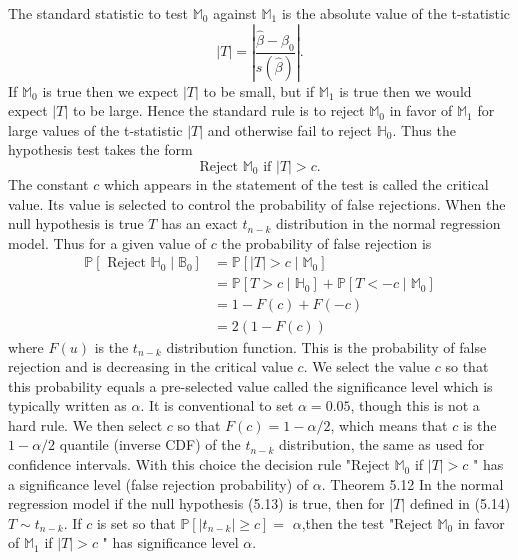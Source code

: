 \documentclass[10pt]{article}
\begin{document}
The standard statistic to test $\mathbb{M}_{0}$ against $\mathbb{M}_{1}$ is the absolute value of the t-statistic
$$
|T|=\left|\frac{\widehat{\beta}-\beta_{0}}{s(\widehat{\beta})}\right| .
$$
If $\mathbb{M}_{0}$ is true then we expect $|T|$ to be small, but if $\mathbb{M}_{1}$ is true then we would expect $|T|$ to be large. Hence the standard rule is to reject $\mathbb{M}_{0}$ in favor of $\mathbb{M}_{1}$ for large values of the t-statistic $|T|$ and otherwise fail to reject $\mathbb{H}_{0}$. Thus the hypothesis test takes the form
$$
\text { Reject } \mathbb{M}_{0} \text { if }|T|>c \text {. }
$$
The constant $c$ which appears in the statement of the test is called the critical value. Its value is selected to control the probability of false rejections. When the null hypothesis is true $T$ has an exact $t_{n-k}$ distribution in the normal regression model. Thus for a given value of $c$ the probability of false rejection is
$$
\begin{aligned}
\mathbb{P}\left[\text { Reject } \mathbb{H}_{0} \mid \mathbb{B}_{0}\right] &=\mathbb{P}\left[|T|>c \mid \mathbb{M}_{0}\right] \\
&=\mathbb{P}\left[T>c \mid \mathbb{H}_{0}\right]+\mathbb{P}\left[T<-c \mid \mathbb{M}_{0}\right] \\
&=1-F(c)+F(-c) \\
&=2(1-F(c))
\end{aligned}
$$
where $F(u)$ is the $t_{n-k}$ distribution function. This is the probability of false rejection and is decreasing in the critical value $c$. We select the value $c$ so that this probability equals a pre-selected value called the significance level which is typically written as $\alpha$. It is conventional to set $\alpha=0.05$, though this is not a hard rule. We then select $c$ so that $F(c)=1-\alpha / 2$, which means that $c$ is the $1-\alpha / 2$ quantile (inverse CDF) of the $t_{n-k}$ distribution, the same as used for confidence intervals. With this choice the decision rule "Reject $\mathbb{M}_{0}$ if $|T|>c$ " has a significance level (false rejection probability) of $\alpha$. Theorem 5.12 In the normal regression model if the null hypothesis (5.13) is true, then for $|T|$ defined in (5.14) $T \sim t_{n-k}$. If $c$ is set so that $\mathbb{P}\left[\left|t_{n-k}\right| \geq c\right]=$ $\alpha$,then the test "Reject $\mathbb{M}_{0}$ in favor of $\mathbb{M}_{1}$ if $|T|>c$ " has significance level $\alpha$.
\end{document}
